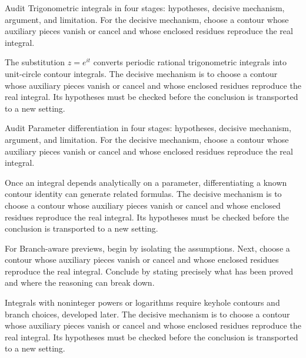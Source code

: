 \begin{problem}\label{prob:iv11-problem-06}
Audit Trigonometric integrals in four stages: hypotheses, decisive mechanism, argument, and limitation. For the decisive mechanism, choose a contour whose auxiliary pieces vanish or cancel and whose enclosed residues reproduce the real integral.
\end{problem}
\begin{solution}
The substitution $z=e^{it}$ converts periodic rational trigonometric integrals into unit-circle contour integrals. The decisive mechanism is to choose a contour whose auxiliary pieces vanish or cancel and whose enclosed residues reproduce the real integral. Its hypotheses must be checked before the conclusion is transported to a new setting.
\end{solution}

\begin{problem}\label{prob:iv11-problem-07}
Audit Parameter differentiation in four stages: hypotheses, decisive mechanism, argument, and limitation. For the decisive mechanism, choose a contour whose auxiliary pieces vanish or cancel and whose enclosed residues reproduce the real integral.
\end{problem}
\begin{solution}
Once an integral depends analytically on a parameter, differentiating a known contour identity can generate related formulas. The decisive mechanism is to choose a contour whose auxiliary pieces vanish or cancel and whose enclosed residues reproduce the real integral. Its hypotheses must be checked before the conclusion is transported to a new setting.
\end{solution}

\begin{problem}\label{prob:iv11-problem-08}
For Branch-aware previews, begin by isolating the assumptions. Next, choose a contour whose auxiliary pieces vanish or cancel and whose enclosed residues reproduce the real integral. Conclude by stating precisely what has been proved and where the reasoning can break down.
\end{problem}
\begin{solution}
Integrals with noninteger powers or logarithms require keyhole contours and branch choices, developed later. The decisive mechanism is to choose a contour whose auxiliary pieces vanish or cancel and whose enclosed residues reproduce the real integral. Its hypotheses must be checked before the conclusion is transported to a new setting.
\end{solution}

